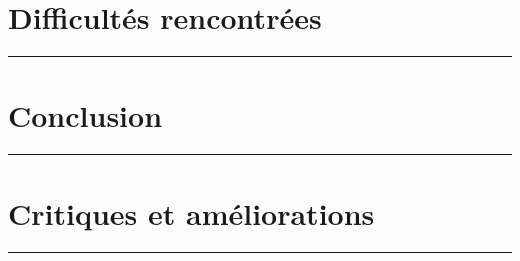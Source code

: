 \documentclass[10pt,letterpaper]{article}
\begin{document}
\vspace{1em}


\section{Difficultés rencontrées}
\hrule
\vspace{1em}
\lipsum[3]

\vspace{1em}


\section{Conclusion}
\hrule
\vspace{1em}
\lipsum[4]

\vspace{1em}


\section{Critiques et améliorations}
\hrule
\vspace{1em}
\lipsum[5]
\end{document}

